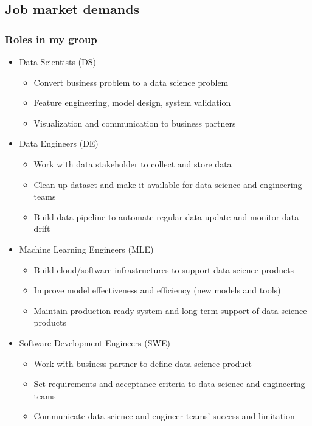 \documentclass[aspectratio=169,xcolor=x11names,table]{beamer}
\begin{document}
\subsection{Job market demands}
\begin{frame}
	\frametitle{Roles in my group}
	\begin{itemize}
		\item<1> Data Scientists (DS)
			\begin{itemize}
				\item Convert business problem to a data science problem
				\item Feature engineering, model design, system validation
				\item Visualization and communication to business partners
			\end{itemize}
		\item<2> Data Engineers (DE)
			\begin{itemize}
				\item Work with data stakeholder to collect and store data
				\item Clean up dataset and make it available for data science and engineering teams
				\item Build data pipeline to automate regular data update and monitor data drift
			\end{itemize}
		\item<3> Machine Learning Engineers (MLE)
			\begin{itemize}
				\item Build cloud/software infrastructures to support data science products
				\item Improve model effectiveness and efficiency (new models and tools)
				\item Maintain production ready system and long-term support of data science products
			\end{itemize}
		\item<4> Software Development Engineers (SWE)
			\begin{itemize}
				\item Work with business partner to define data science product
				\item Set requirements and acceptance criteria to data science and engineering teams
				\item Communicate data science and engineer teams' success and limitation
			\end{itemize}
	\end{itemize}
\end{frame}
\end{document}
